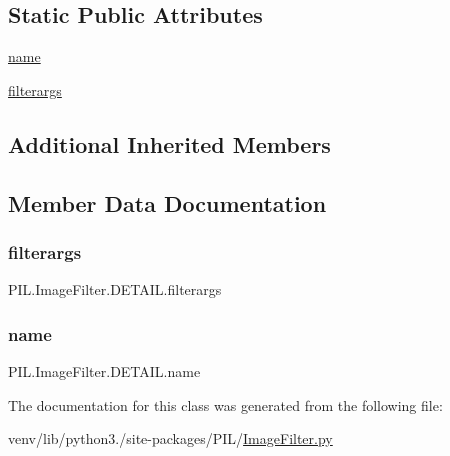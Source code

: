 \subsection*{Static Public Attributes}
\begin{DoxyCompactItemize}
\item 
\hyperlink{classPIL_1_1ImageFilter_1_1DETAIL_ace536ea1546b79135cb8c91c7ab48dd9}{name}
\item 
\hyperlink{classPIL_1_1ImageFilter_1_1DETAIL_a8b7d493741c79304b8d249195634e744}{filterargs}
\end{DoxyCompactItemize}
\subsection*{Additional Inherited Members}


\subsection{Member Data Documentation}
\mbox{\label{classPIL_1_1ImageFilter_1_1DETAIL_a8b7d493741c79304b8d249195634e744}} 
\subsubsection{\texorpdfstring{filterargs}{filterargs}}
{\footnotesize\ttfamily P\+I\+L.\+Image\+Filter.\+D\+E\+T\+A\+I\+L.\+filterargs\hspace{0.3cm}{\ttfamily [static]}}

\mbox{\label{classPIL_1_1ImageFilter_1_1DETAIL_ace536ea1546b79135cb8c91c7ab48dd9}} 
\subsubsection{\texorpdfstring{name}{name}}
{\footnotesize\ttfamily P\+I\+L.\+Image\+Filter.\+D\+E\+T\+A\+I\+L.\+name\hspace{0.3cm}{\ttfamily [static]}}



The documentation for this class was generated from the following file\+:\begin{DoxyCompactItemize}
\item 
venv/lib/python3./site-\/packages/\+P\+I\+L/\hyperlink{ImageFilter_8py}{Image\+Filter.\+py}\end{DoxyCompactItemize}
